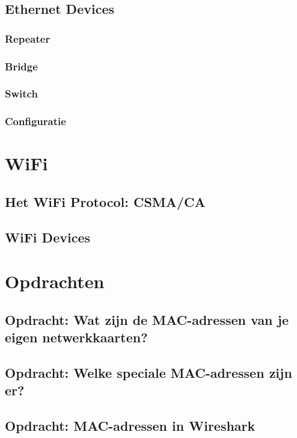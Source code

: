 \documentclass[a4paper,12pt,twoside,openright,titlepage]{book}
\begin{document}
\section{Ethernet Devices}
\subsection{Repeater}

\subsection{Bridge}

\subsection{Switch}

\subsection{Configuratie}


\chapter{WiFi}


\section{Het WiFi Protocol: CSMA/CA}


\section{WiFi Devices}


\chapter{Opdrachten}
\section{Opdracht: Wat zijn de MAC-adressen van je eigen netwerkkaarten?}

\section{Opdracht: Welke speciale MAC-adressen zijn er?}

\section{Opdracht: MAC-adressen in Wireshark}

\end{document}
